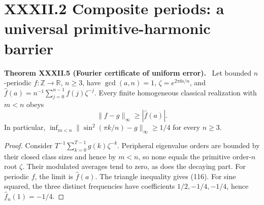 \documentclass[11pt,a4paper,oneside]{book}
\newcommand{\R}{\mathbb R}\newcommand{\C}{\mathbb C}\newcommand{\Z}{\mathbb Z}\newcommand{\N}{\mathbb N}\newcommand{\Q}{\mathbb Q}
\newcommand{\statement}[3]{\par\medskip\noindent\textbf{#1 #2 (#3).}\ }
\begin{document}
\section*{XXXII.2 Composite periods: a universal primitive-harmonic barrier}
\statement{Theorem}{XXXII.5}{Fourier certificate of uniform error} Let bounded $n$-periodic $f:\Z\to\R$, $n\ge3$, have $\gcd(a,n)=1$, $\zeta=e^{2\pi\ii a/n}$, and $\widehat f(a)=n^{-1}\sum_{j=0}^{n-1}f(j)\zeta^{-j}$. Every finite homogeneous classical realization with $m<n$ obeys
\begin{equation}\|f-g\|_\infty\ge|\widehat f(a)|.\tag{116}\end{equation}
In particular, $\inf_{m<n}\|\sin^2(\pi k/n)-g\|_\infty\ge1/4$ for every $n\ge3$.
\begin{proof}Consider $T^{-1}\sum_{k=0}^{T-1}g(k)\zeta^{-k}$. Peripheral eigenvalue orders are bounded by their closed class sizes and hence by $m<n$, so none equals the primitive order-$n$ root $\zeta$. Their modulated averages tend to zero, as does the decaying part. For periodic $f$, the limit is $\widehat f(a)$. The triangle inequality gives (116). For sine squared, the three distinct frequencies have coefficients $1/2,-1/4,-1/4$, hence $\widehat f_n(1)=-1/4$.\end{proof}
\end{document}

